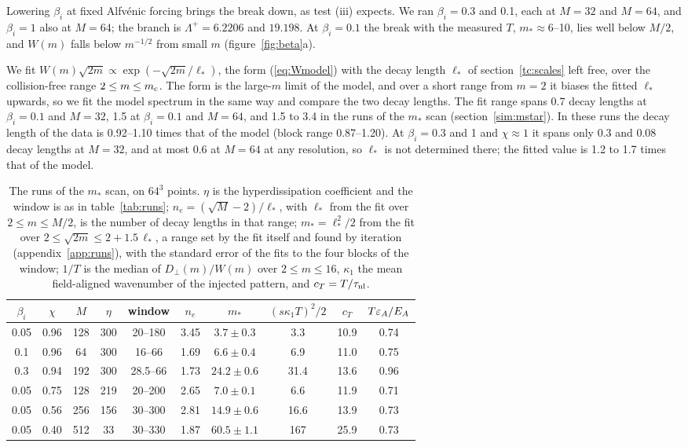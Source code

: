 Lowering $\beta_i$ at fixed Alfv\'enic forcing brings the break down, as test (iii) expects. We ran $\beta_i=0.3$ and 0.1, each at $M=32$ and $M=64$, and $\beta_i=1$ also at $M=64$; the branch is $\Lambda^+=6.2206$ and $19.198$. At $\beta_i=0.1$ the break with the measured $T$, $m_*\approx6$--10, lies well below $M/2$, and $W(m)$ falls below $m^{-1/2}$ from small $m$ (figure~\ref{fig:beta}a).

We fit $W(m)\sqrt{2m}\propto\exp(-\sqrt{2m}/\ell_*)$, the form (\ref{eq:Wmodel}) with the decay length $\ell_*$ of section~\ref{tc:scales} left free, over the collision-free range $2\le m\le m_{\rm c}$. The form is the large-$m$ limit of the model, and over a short range from $m=2$ it biases the fitted $\ell_*$ upwards, so we fit the model spectrum in the same way and compare the two decay lengths. The fit range spans 0.7 decay lengths at $\beta_i=0.1$ and $M=32$, 1.5 at $\beta_i=0.1$ and $M=64$, and 1.5 to 3.4 in the runs of the $m_*$ scan (section~\ref{sim:mstar}). In these runs the decay length of the data is 0.92--1.10 times that of the model (block range 0.87--1.20). At $\beta_i=0.3$ and 1 and $\chi\approx1$ it spans only 0.3 and 0.08 decay lengths at $M=32$, and at most 0.6 at $M=64$ at any resolution, so $\ell_*$ is not determined there; the fitted value is 1.2 to 1.7 times that of the model.

\begin{table}[tbp]
  \centering
  \caption{The runs of the $m_*$ scan, on $64^3$ points. $\eta$ is the hyperdissipation coefficient and the window is as in table~\ref{tab:runs}; $n_e=(\sqrt M-2)/\ell_*$, with $\ell_*$ from the fit over $2\le m\le M/2$, is the number of decay lengths in that range; $m_*=\ell_*^2/2$ from the fit over $2\le\sqrt{2m}\le2+1.5\,\ell_*$, a range set by the fit itself and found by iteration (appendix~\ref{app:runs}), with the standard error of the fits to the four blocks of the window; $1/T$ is the median of $D_\perp(m)/W(m)$ over $2\le m\le16$, $\kappa_1$ the mean field-aligned wavenumber of the injected pattern, and $c_T=T/\tau_{\rm nl}$.}
  \label{tab:mstar}
  \begin{tabular}{cccccccccc}
    \toprule
    $\beta_i$ & $\chi$ & $M$ & $\eta$ & window & $n_e$ & $m_*$ & $(s\kappa_1T)^2/2$ & $c_T$ & $T\varepsilon_A/E_A$ \\
    \midrule
    0.05 & 0.96 & 128 & 300 & 20--180 & 3.45 & $3.7\pm0.3$ & 3.3 & 10.9 & 0.74 \\
    0.1 & 0.96 & 64 & 300 & 16--66 & 1.69 & $6.6\pm0.4$ & 6.9 & 11.0 & 0.75 \\
    0.3 & 0.94 & 192 & 300 & 28.5--66 & 1.73 & $24.2\pm0.6$ & 31.4 & 13.6 & 0.96 \\
    0.05 & 0.75 & 128 & 219 & 20--200 & 2.65 & $7.0\pm0.1$ & 6.6 & 11.9 & 0.71 \\
    0.05 & 0.56 & 256 & 156 & 30--300 & 2.81 & $14.9\pm0.6$ & 16.6 & 13.9 & 0.73 \\
    0.05 & 0.40 & 512 & 33 & 30--330 & 1.87 & $60.5\pm1.1$ & 167 & 25.9 & 0.73 \\
    \bottomrule
  \end{tabular}
\end{table}

